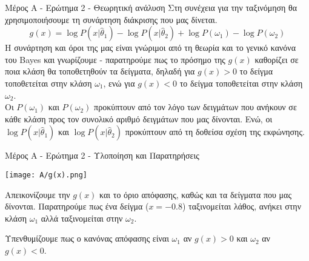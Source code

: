 \documentclass{beamer}
\begin{document}
\begin{frame}{Μέρος Α - Ερώτημα 2 - Θεωρητική ανάλυση}
    Στη συνέχεια για την ταξινόμηση θα χρησιμοποιήσουμε τη συνάρτηση διάκρισης που μας δίνεται.
     $$g(x) = \log P(x | \hat{\theta}_1) - \log P(x | \hat{\theta}_2) + \log P(\omega_1) - \log P(\omega_2)$$
Η συνάρτηση και όροι της μας είναι γνώριμοι από τη θεωρία και το γενικό κανόνα του Bayes και γνωρίζουμε - παρατηρούμε πως το πρόσημο της $g(x)$ καθορίζει σε ποια κλάση θα τοποθετηθούν τα δείγματα, δηλαδή για $g(x) > 0 $ το δείγμα τοποθετείται στην κλάση $\omega_1$, ενώ για $g(x) < 0 $ το δείγμα τοποθετείται στην κλάση $\omega_2$.\\
Οι $P(\omega_1)$ και $P(\omega_2)$ προκύπτουν από τον λόγο των δειγμάτων που ανήκουν σε κάθε κλάση προς τον συνολικό αριθμό δειγμάτων που μας δίνονται. Ενώ, οι $\log P(x | \hat{\theta}_1)$ και $ \log P(x | \hat{\theta}_2)$ προκύπτουν από τη δοθείσα σχέση της εκφώνησης.
\end{frame}

\begin{frame}{Μέρος Α - Ερώτημα 2 - Υλοποίηση και Παρατηρήσεις}

\begin{minipage}{0.7\textwidth}
    \texttt{[image: A/g(x).png]}
\end{minipage}
\hfill
\begin{minipage}{0.28\textwidth}
Απεικονίζουμε την $g(x)$ και το όριο απόφασης, καθώς και τα δείγματα που μας δίνονται.
Παρατηρούμε πως ένα δείγμα ($x=-0.8$) ταξινομείται λάθος, ανήκει στην κλάση $\omega_1$ αλλά ταξινομείται στην $\omega_2$.
\end{minipage}
\vspace{0.7cm}
\begin{minipage}{0.6\textwidth}
    Υπενθυμίζουμε πως ο κανόνας απόφασης είναι $\omega_1$ αν $g(x)>0$ και $\omega_2$ αν $g(x)<0$.
\end{minipage}
\end{frame}

\end{document}

